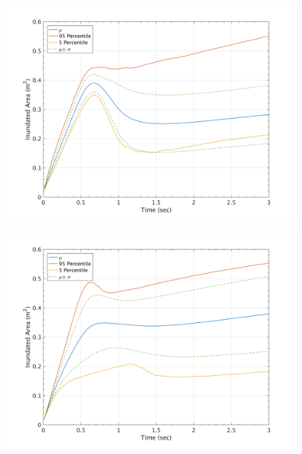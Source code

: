 \documentclass{article}
\begin{document}
\begin{figure}[H]
        \begin{minipage}[b]{0.5\linewidth}
                \centering
                \includegraphics[width=1\textwidth]{InclinedPlane/GlobalRecords/C_Global_Ar.png}
                \label{fig:Ramp-SP-InundAr-C}
        \end{minipage}
        \begin{minipage}[b]{0.5\linewidth}
                \centering
                \includegraphics[width=1\textwidth]{InclinedPlane/GlobalRecords/P_Global_Ar.png}
                \label{fig:Ramp-SP-InundAr-P}
        \end{minipage}


\end{figure}
\end{document}
